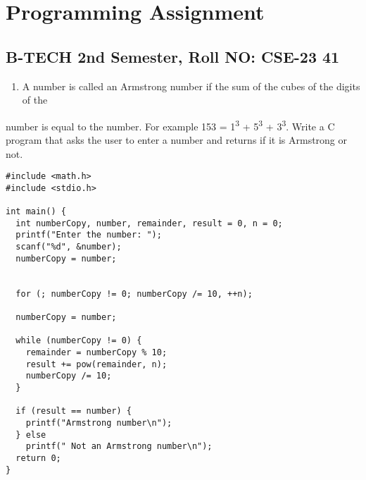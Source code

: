 \documentclass[11pt]{article}
\author{sunny}
\date{\today}
\title{}
\begin{document}
\tableofcontents

\section{Programming Assignment}
\label{sec:org848fb0e}

\subsection{B-TECH 2nd Semester, Roll NO: CSE-23 41}
\label{sec:org7c60f79}

\begin{enumerate}
\item A number is called an Armstrong number if the sum of the cubes of the digits of the
\end{enumerate}
number is equal to the number. For example 153 = 1\textsuperscript{3} + 5\textsuperscript{3} + 3\textsuperscript{3}. Write a C program
that asks the user to enter a number and returns if it is Armstrong or not. 

\begin{verbatim}
#include <math.h>
#include <stdio.h>

int main() {
  int numberCopy, number, remainder, result = 0, n = 0;
  printf("Enter the number: ");
  scanf("%d", &number);
  numberCopy = number;


  for (; numberCopy != 0; numberCopy /= 10, ++n);

  numberCopy = number;

  while (numberCopy != 0) {
    remainder = numberCopy % 10;
    result += pow(remainder, n);
    numberCopy /= 10;
  }

  if (result == number) {
    printf("Armstrong number\n");
  } else
    printf(" Not an Armstrong number\n");
  return 0;
}
\end{verbatim}
\end{document}
